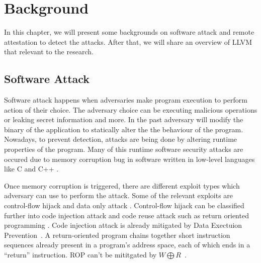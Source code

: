 
\chapter{Background} %

\label{Chapter2} %

In this chapter, we will present some backgrounds on software attack and remote attestation to detect the attacks. After that, we will share an overview of LLVM that relevant to the research. 

\section{Software Attack}


Software attack happens when adversaries make program execution to perform 
action of their choice. The adversary choice can be executing malicious 
operations or leaking secret information and more.
In the past adversary will modify the binary of the application to statically 
alter the the behaviour of the program. Nowadays, to prevent detection, attacks 
are being done by altering runtime properties of the program. Many of this 
runtime software security attacks are occured due to memory corruption bug in 
software written in low-level languages like C and C++ 
\cite{szekeresSoKEternalWar2013}.

Once memory corruption is triggered, there are different exploit types which 
adversary can use to perform the attack. Some of the relevant exploits are 
control-flow hijack \cite{shachamGeometryInnocentFlesh2007, 
schusterCounterfeitObjectorientedProgramming2015}  and data only attack 
\cite{chenNonControlDataAttacksAre2005, 
carliniControlFlowBendingEffectiveness2015}. Control-flow hijack can be 
classified further into code injection attack and code reuse attack such as 
return oriented programming \cite{roemerReturnorientedProgrammingSystems2012}. 
Code injection attack is already mitigated by Data Exectuion 
Prevention~. A return-oriented program chains together short 
instruction sequences already 
present in a program’s address space, each of which ends in a “return”
 instruction. ROP can't be mititgated by \( W \bigoplus R \)~.
 
